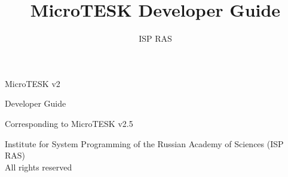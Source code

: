 \documentclass[12pt,letterpaper,extrafontsizes]{memoir}
\title{MicroTESK Developer Guide}
\author{ISP RAS}
\begin{document}

\frontmatter

\pagestyle{empty}


\vspace*{\fill}
\begin{center}
\HUGE\textsf{MicroTESK v2}\par
\end{center}

\begin{center}
\Huge\textsf{Developer Guide}\par
\end{center}

\begin{center}
\normalsize\textsf{Corresponding to MicroTESK v2.5}\par
\end{center}

\vspace*{\fill}
\clearpage


\begingroup
\footnotesize
\setlength{\parindent}{0pt}
\setlength{\parskip}{\baselineskip}
\textcopyright{} Institute for System Programming of the Russian Academy of Sciences (ISP RAS)\\
All rights reserved
\endgroup
\clearpage


\pagestyle{headings}

\tableofcontents


\mainmatter

%
\end{document}
